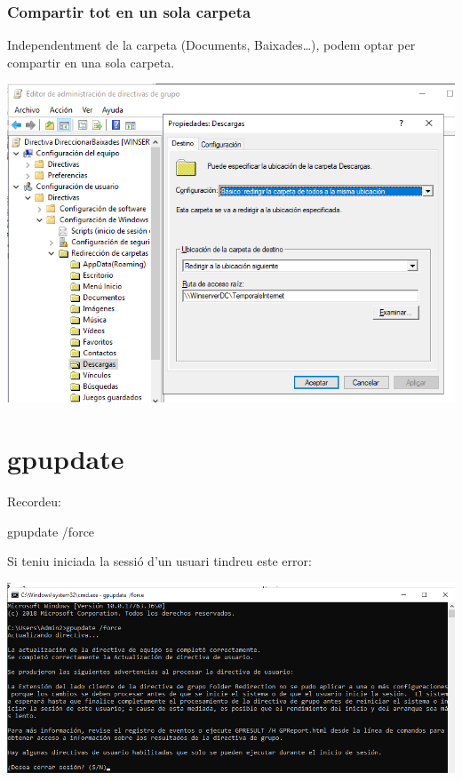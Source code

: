 \documentclass[
  a4paper,
]{article}
\newenvironment{Shaded}{\begin{snugshade}}{\end{snugshade}}
\newcommand{\AttributeTok}[1]{\textcolor[rgb]{0.13,0.29,0.53}{#1}}
\newcommand{\NormalTok}[1]{#1}
\begin{document}
\subsubsection{Compartir tot en un sola
carpeta}\label{compartir-tot-en-un-sola-carpeta}

Independentment de la carpeta (Documents, Baixades\ldots), podem optar
per compartir en una sola carpeta.

\includegraphics{png/CrearCarpetaRuta2.png}

\section{gpupdate}\label{gpupdate}

Recordeu:

\begin{Shaded}
\begin{Highlighting}[]
\NormalTok{gpupdate }\AttributeTok{/force}
\end{Highlighting}
\end{Shaded}

Si teniu iniciada la sessió d'un usuari tindreu este error:

\includegraphics{png/gpupdateError.png}
\end{document}

